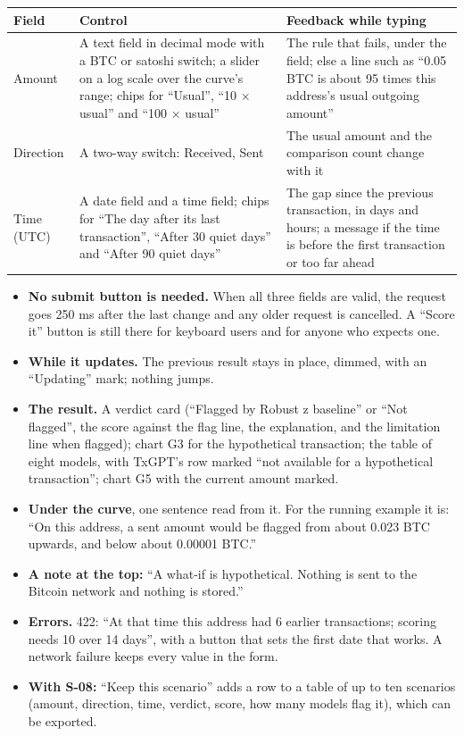 \begin{longtable}{@{}L{2.2cm}L{5.6cm}L{6.2cm}@{}}
\toprule
\textbf{Field} & \textbf{Control} & \textbf{Feedback while typing} \\
\midrule
\endhead
Amount & A text field in decimal mode with a BTC or satoshi switch; a slider on a log scale over the curve's range; chips for ``Usual'', ``10 × usual'' and ``100 × usual'' & The rule that fails, under the field; else a line such as ``0.05 BTC is about 95 times this address's usual outgoing amount'' \\
Direction & A two-way switch: Received, Sent & The usual amount and the comparison count change with it \\
Time (UTC) & A date field and a time field; chips for ``The day after its last transaction'', ``After 30 quiet days'' and ``After 90 quiet days'' & The gap since the previous transaction, in days and hours; a message if the time is before the first transaction or too far ahead \\
\bottomrule
\end{longtable}

\begin{itemize}
  \item \textbf{No submit button is needed.} When all three fields are valid, the request goes
    250 ms after the last change and any older request is cancelled. A ``Score it'' button is still
    there for keyboard users and for anyone who expects one.
  \item \textbf{While it updates.} The previous result stays in place, dimmed, with an ``Updating''
    mark; nothing jumps.
  \item \textbf{The result.} A verdict card (``Flagged by Robust z baseline'' or ``Not flagged'',
    the score against the flag line, the explanation, and the limitation line when flagged); chart
    G3 for the hypothetical transaction; the table of eight models, with TxGPT's row marked ``not
    available for a hypothetical transaction''; chart G5 with the current amount marked.
  \item \textbf{Under the curve}, one sentence read from it. For the running example it is: ``On
    this address, a sent amount would be flagged from about 0.023 BTC upwards, and below about
    0.00001 BTC.''
  \item \textbf{A note at the top:} ``A what-if is hypothetical. Nothing is sent to the Bitcoin
    network and nothing is stored.''
  \item \textbf{Errors.} 422: ``At that time this address had 6 earlier transactions; scoring
    needs 10 over 14 days'', with a button that sets the first date that works. A network failure
    keeps every value in the form.
  \item \textbf{With S-08:} ``Keep this scenario'' adds a row to a table of up to ten scenarios
    (amount, direction, time, verdict, score, how many models flag it), which can be exported.
\end{itemize}

